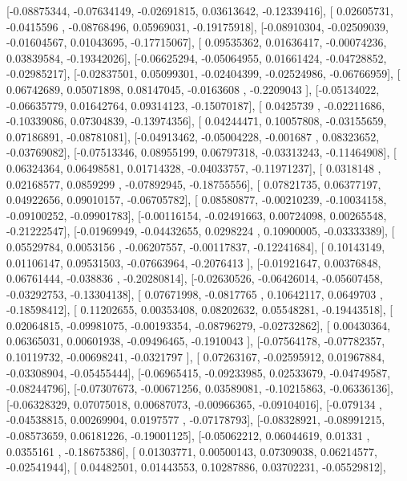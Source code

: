 \documentclass{article}
\begin{document}
       [-0.08875344, -0.07634149, -0.02691815,  0.03613642, -0.12339416],
       [ 0.02605731, -0.0415596 , -0.08768496,  0.05969031, -0.19175918],
       [-0.08910304, -0.02509039, -0.01604567,  0.01043695, -0.17715067],
       [ 0.09535362,  0.01636417, -0.00074236,  0.03839584, -0.19342026],
       [-0.06625294, -0.05064955,  0.01661424, -0.04728852, -0.02985217],
       [-0.02837501,  0.05099301, -0.02404399, -0.02524986, -0.06766959],
       [ 0.06742689,  0.05071898,  0.08147045, -0.0163608 , -0.2209043 ],
       [-0.05134022, -0.06635779,  0.01642764,  0.09314123, -0.15070187],
       [ 0.0425739 , -0.02211686, -0.10339086,  0.07304839, -0.13974356],
       [ 0.04244471,  0.10057808, -0.03155659,  0.07186891, -0.08781081],
       [-0.04913462, -0.05004228, -0.001687  ,  0.08323652, -0.03769082],
       [-0.07513346,  0.08955199,  0.06797318, -0.03313243, -0.11464908],
       [ 0.06324364,  0.06498581,  0.01714328, -0.04033757, -0.11971237],
       [ 0.0318148 ,  0.02168577,  0.0859299 , -0.07892945, -0.18755556],
       [ 0.07821735,  0.06377197,  0.04922656,  0.09010157, -0.06705782],
       [ 0.08580877, -0.00210239, -0.10034158, -0.09100252, -0.09901783],
       [-0.00116154, -0.02491663,  0.00724098,  0.00265548, -0.21222547],
       [-0.01969949, -0.04432655,  0.0298224 ,  0.10900005, -0.03333389],
       [ 0.05529784,  0.0053156 , -0.06207557, -0.00117837, -0.12241684],
       [ 0.10143149,  0.01106147,  0.09531503, -0.07663964, -0.2076413 ],
       [-0.01921647,  0.00376848,  0.06761444, -0.038836  , -0.20280814],
       [-0.02630526, -0.06426014, -0.05607458, -0.03292753, -0.13304138],
       [ 0.07671998, -0.0817765 ,  0.10642117,  0.0649703 , -0.18598412],
       [ 0.11202655,  0.00353408,  0.08202632,  0.05548281, -0.19443518],
       [ 0.02064815, -0.09981075, -0.00193354, -0.08796279, -0.02732862],
       [ 0.00430364,  0.06365031,  0.00601938, -0.09496465, -0.1910043 ],
       [-0.07564178, -0.07782357,  0.10119732, -0.00698241, -0.0321797 ],
       [ 0.07263167, -0.02595912,  0.01967884, -0.03308904, -0.05455444],
       [-0.06965415, -0.09233985,  0.02533679, -0.04749587, -0.08244796],
       [-0.07307673, -0.00671256,  0.03589081, -0.10215863, -0.06336136],
       [-0.06328329,  0.07075018,  0.00687073, -0.00966365, -0.09104016],
       [-0.079134  , -0.04538815,  0.00269904,  0.0197577 , -0.07178793],
       [-0.08328921, -0.08991215, -0.08573659,  0.06181226, -0.19001125],
       [-0.05062212,  0.06044619,  0.01331   ,  0.0355161 , -0.18675386],
       [ 0.01303771,  0.00500143,  0.07309038,  0.06214577, -0.02541944],
       [ 0.04482501,  0.01443553,  0.10287886,  0.03702231, -0.05529812],
\end{document}
